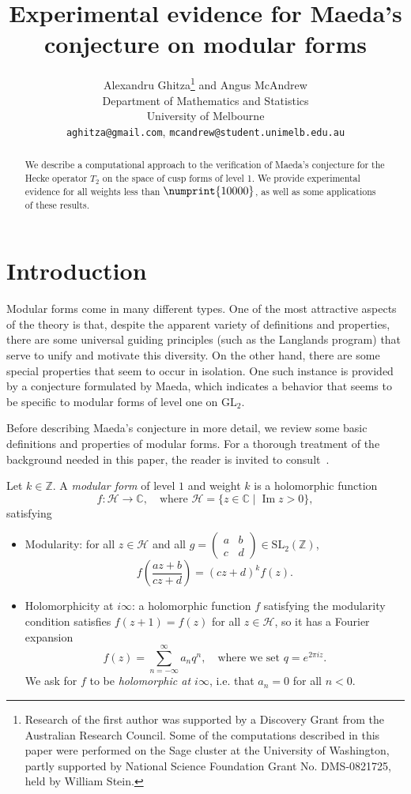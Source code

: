 \documentclass[11pt]{article}
\title{Experimental evidence for Maeda's conjecture on modular forms
}
\author{
Alexandru Ghitza\footnote{Research of the first author was supported by 
a Discovery Grant from the Australian Research Council.
Some of the computations described in this paper were performed on the Sage
cluster at the University of Washington, partly supported by National 
Science Foundation Grant No. DMS-0821725, held by William Stein.}  
{} and 
Angus McAndrew\\
Department of Mathematics and Statistics\\
University of Melbourne\\
{\tt aghitza@gmail.com}, {\tt mcandrew@student.unimelb.edu.au}
}
\date{}
\theoremstyle{plain}
\theoremstyle{definition}
\theoremstyle{remark}
\numberwithin{equation}{section}
\newcommand{\longto}{\longrightarrow}
\newcommand{\CC}{\mathbb{C}}
\newcommand{\ZZ}{\mathbb{Z}}
\newcommand{\cH}{\mathcal{H}}
\renewcommand{\Im}{\operatorname{Im}}
\newcommand{\bound}{\numprint{10000}}
\newcommand{\GL}{\mathrm{GL}}
\newcommand{\SL}{\mathrm{SL}}
\begin{document}
\thispagestyle{empty}

\maketitle
\begin{abstract}
  We describe a computational approach to the verification of Maeda's conjecture
  for the Hecke operator $T_2$ on the space of cusp forms of level 1. We provide
  experimental evidence for all weights less than $\bound$, as well as some
  applications of these results.
\end{abstract}


\section{Introduction}
\label{sect:introduction}
Modular forms come in many different types.  One of the most attractive
aspects of the theory is that, despite the apparent variety of definitions
and properties, there are some universal guiding principles (such as the
Langlands program) that serve to unify and motivate this diversity.  On the
other hand, there are some special properties that seem to occur in isolation.
One such instance is provided by a conjecture formulated by Maeda, which
indicates a behavior that seems to be specific to modular forms of level one
on $\GL_2$.  

Before describing Maeda's conjecture in more detail, we review some basic 
definitions and properties of modular forms.  For a thorough treatment of
the background needed in this paper, the reader is invited to
consult~\cite{Stein}.

Let $k\in\ZZ$.  A \emph{modular form} of level $1$ and weight $k$ is a
holomorphic function
\begin{equation*}
  f\colon\cH\longto\CC, \quad\text{where }
  \cH=\{z\in\CC\mid \Im z>0\},
\end{equation*}
satisfying
\begin{itemize}
  \item Modularity: for all $z\in\cH$ and all
    $g=\left(\begin{smallmatrix}a&b\\c&d\end{smallmatrix}\right)\in\SL_2(\ZZ)$,
      \begin{equation*}
        f\left(\frac{az+b}{cz+d}\right)=(cz+d)^kf(z).
      \end{equation*}
  \item Holomorphicity at $i\infty$: a holomorphic function $f$ satisfying the
    modularity condition satisfies $f(z+1)=f(z)$ for all $z\in\cH$, so it has
    a Fourier expansion
    \begin{equation*}
      f(z)=\sum_{n=-\infty}^\infty a_nq^n,\quad\text{where we set }
      q=e^{2\pi i z}.
    \end{equation*}
    We ask for $f$ to be \emph{holomorphic at $i\infty$}, i.e. that $a_n=0$
    for all $n<0$.
\end{itemize}
\end{document}
